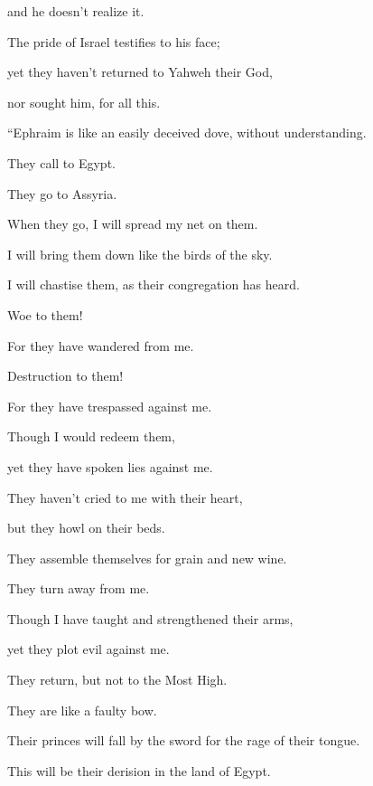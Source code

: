 {\par }{\QB and he doesn’t realize it.
\par }{\Q {}The pride of Israel testifies to his face;
\par }{\QB yet they haven’t returned to Yahweh their God,
\par }{\QB nor sought him, for all this.
\par }{\BB \par }{\Q {}“Ephraim is like an easily deceived dove, without understanding.
\par }{\QB They call to Egypt.
\par }{\QB They go to Assyria.
\par }{\Q {}When they go, I will spread my net on them.
\par }{\QB I will bring them down like the birds of the sky.
\par }{\QB I will chastise them, as their congregation has heard.
\par }{\Q {}Woe to them!
\par }{\QB For they have wandered from me.
\par }{\Q Destruction to them!
\par }{\QB For they have trespassed against me.
\par }{\Q Though I would redeem them,
\par }{\QB yet they have spoken lies against me.
\par }{\Q {}They haven’t cried to me with their heart,
\par }{\QB but they howl on their beds.
\par }{\Q They assemble themselves for grain and new wine.
\par }{\QB They turn away from me.
\par }{\Q {}Though I have taught and strengthened their arms,
\par }{\QB yet they plot evil against me.
\par }{\Q {}They return, but not to the Most High.
\par }{\QB They are like a faulty bow.
\par }{\QB Their princes will fall by the sword for the rage of their tongue.
\par }{\QB This will be their derision in the land of Egypt.
\par }{\BB \par }

